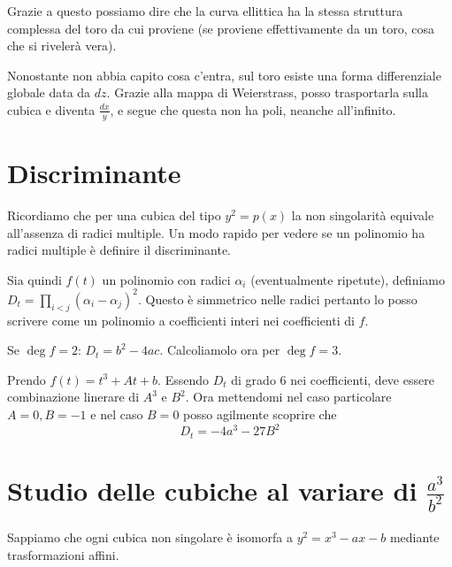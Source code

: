 	Grazie a questo possiamo dire che la curva ellittica ha la stessa struttura complessa del toro da cui proviene (se proviene effettivamente da un toro, cosa che si rivelerà vera).
	
	\begin{osservazione}
		Nonostante non abbia capito cosa c'entra, sul toro esiste una forma differenziale globale data da $dz$. Grazie alla mappa di Weierstrass, posso trasportarla sulla cubica e diventa $\frac{dx}y$, e segue che questa non ha poli, neanche all'infinito.
	
	\end{osservazione}

        
	\section{Discriminante}
	
	Ricordiamo che per una cubica del tipo $y^2=p(x)$ la non singolarità equivale all'assenza di radici multiple. Un modo rapido per vedere se un polinomio ha radici multiple è definire il discriminante.
	
	Sia quindi $f(t)$ un polinomio con radici $\alpha_i$ (eventualmente ripetute), definiamo $D_t=\prod_{i<j} (\alpha_i - \alpha_j)^2$. Questo è simmetrico nelle radici pertanto lo posso scrivere come un polinomio a coefficienti interi nei coefficienti di $f$.
	
	Se $\deg f=2$: $D_t= b^2-4ac$. Calcoliamolo ora per $\deg f=3$.

	Prendo $f(t)=t^3+At+b$. Essendo $D_t$ di grado 6 nei coefficienti, deve essere combinazione linerare di $A^3$ e $B^2$. Ora mettendomi nel caso particolare $A=0,B=-1$ e nel caso $B=0$ posso agilmente scoprire che 
	\[
		D_t=-4a^3-27B^2
	\]
	
	\section{Studio delle cubiche al variare di $\frac{a^3}{b^2}$}
	
	Sappiamo che ogni cubica non singolare è isomorfa a $y^2=x^3-ax-b$ mediante trasformazioni affini.
	
